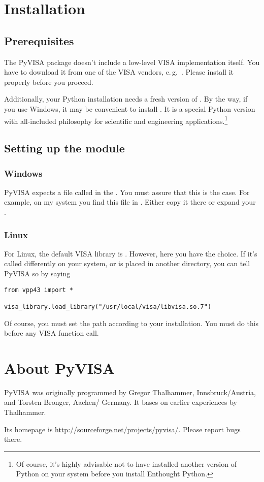 \documentclass{howto}
\begin{document}
\section{Installation}

\subsection{Prerequisites}

The PyVISA package doesn't include a low-level VISA implementation itself.  You
have to download it from one of the VISA vendors, e.\,g.\ .  Please install it properly before you proceed.

Additionally, your Python installation needs a fresh version of
.  By the way,
if you use Windows, it may be convenient to install .  It is a special Python version
with all-included philosophy for scientific and engineering
applications.\footnote{Of course, it's highly advisable not to have installed
  another version of Python on your system before you install Enthought
  Python.}


\subsection{Setting up the module}

\subsubsection{Windows}

PyVISA expects a file called  in the \@.  You
must assure that this is the case.  For example, on my system you find this
file in .  Either copy it there or expand your
\@.


\subsubsection{Linux}

For Linux, the default VISA library is
.  However, here you have the
choice.  If it's called differently on your system, or is placed in another
directory, you can tell PyVISA so by saying
\begin{verbatim}
from vpp43 import *

visa_library.load_library("/usr/local/visa/libvisa.so.7")
\end{verbatim}
Of course, you must set the path according to your installation.  You must do
this before any VISA function call.


\section{About PyVISA}

PyVISA was originally programmed by Gregor Thalhammer, Innsbruck/Austria, and
Torsten Bronger, Aachen/\hskip0pt Germany.  It bases on earlier experiences by
Thalhammer.

Its homepage is \url{http://sourceforge.net/projects/pyvisa/}.  Please report
bugs there.
\end{document}
